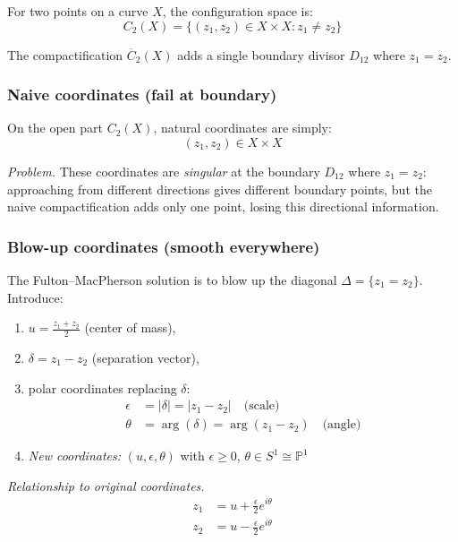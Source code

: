 \begin{example}\label{ex:coords-n2}
For two points on a curve $X$, the configuration space is:
\[C_2(X) = \{(z_1, z_2) \in X \times X : z_1 \neq z_2\}\]

The compactification $\overline{C}_2(X)$ adds a single boundary divisor $D_{12}$ where
$z_1 = z_2$.

\subsubsection{Naive coordinates (fail at boundary)}

On the open part $C_2(X)$, natural coordinates are simply:
\[(z_1, z_2) \in X \times X\]

\emph{Problem.} These coordinates are \emph{singular} at the boundary $D_{12}$ where
$z_1 = z_2$: approaching from different directions gives different boundary points, but the naive compactification adds only one point, losing this directional information.

\subsubsection{Blow-up coordinates (smooth everywhere)}

The Fulton--MacPherson solution is to blow up the diagonal $\Delta = \{z_1 = z_2\}$.
Introduce:
\begin{enumerate}
\item $u = \frac{z_1 + z_2}{2}$ (center of mass),

\item $\delta = z_1 - z_2$ (separation vector),

\item polar coordinates replacing $\delta$:
\begin{align*}
\epsilon &= |\delta| = |z_1 - z_2| \quad \text{(scale)}\\
\theta &= \arg(\delta) = \arg(z_1 - z_2) \quad \text{(angle)}
\end{align*}

\item \emph{New coordinates:} $(u, \epsilon, \theta)$ with $\epsilon \geq 0$, $\theta \in S^1 \cong \mathbb{P}^1$
\end{enumerate}

\emph{Relationship to original coordinates.}
\begin{align}
z_1 &= u + \frac{\epsilon}{2} e^{i\theta} \label{eq:blowup-z1}\\
z_2 &= u - \frac{\epsilon}{2} e^{i\theta} \label{eq:blowup-z2}
\end{align}


\end{example}
